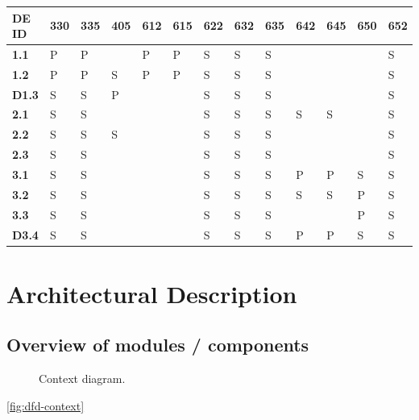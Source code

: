 \documentclass{article}
\begin{document}
\begin{tabular}{ | l | l | l | l | l | l | l | l | l | l | l | l | l |}
\hline
\textbf{DE ID}
             & 330 & 335 & 405 & 612 & 615 & 622 & 632 & 635 & 642 & 645 & 650 & 652 \\ \hline
\textbf{1.1} &   P &   P &     &   P &   P &   S &   S &   S &     &     &     &   S \\ \hline
\textbf{1.2} &   P &   P &   S &   P &   P &   S &   S &   S &     &     &     &   S \\ \hline
\textbf{D1.3}&   S &   S &   P &     &     &   S &   S &   S &     &     &     &   S \\ \hline
\textbf{2.1} &   S &   S &     &     &     &   S &   S &   S &   S &   S &     &   S \\ \hline
\textbf{2.2} &   S &   S &   S &     &     &   S &   S &   S &     &     &     &   S \\ \hline
\textbf{2.3} &   S &   S &     &     &     &   S &   S &   S &     &     &     &   S \\ \hline
\textbf{3.1} &   S &   S &     &     &     &   S &   S &   S &   P &   P &   S &   S \\ \hline
\textbf{3.2} &   S &   S &     &     &     &   S &   S &   S &   S &   S &   P &   S \\ \hline
\textbf{3.3} &   S &   S &     &     &     &   S &   S &   S &     &     &   P &   S \\ \hline
\textbf{D3.4}&   S &   S &     &     &     &   S &   S &   S &   P &   P &   S &   S \\ \hline
\end{tabular}

\newpage

\section{Architectural Description}

\subsection{Overview of modules / components}

\begin{figure}[h!]
    \centering
    \resizebox{\textwidth}{!}{
        
    }
    \caption{Context diagram.}
    \label{fig:dfd-context}
\end{figure}

\autoref{fig:dfd-context}
\end{document}
